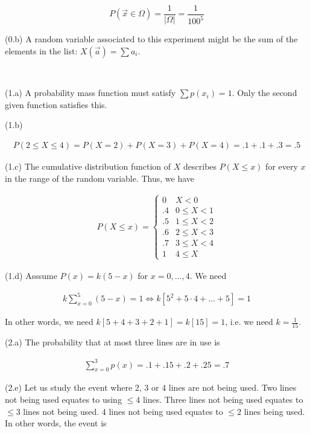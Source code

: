 \documentclass[a4paper, 12pt]{article}
\begin{document}
\begin{equation*}
    P(\overrightarrow{x} \in \Omega) = \frac{1}{|\Omega|} = \frac{1}{100^5}
\end{equation*}

(0.b) A random variable associated to this experiment might be the sum of the elements 
in the list: $X(\overrightarrow{a}) = \sum a_i$.

~ ~ ~ 

(1.a) A probability mass function must satisfy $\sum p(x_i) = 1$. Only the second given 
function satisfies this.

(1.b) 

\begin{align*}
    P(2 \leq X \leq 4) = P(X = 2) + P(X = 3) + P(X=4) = .1 + .1 + .3 = .5
\end{align*}

(1.c) The cumulative distribution function of $X$ describes $P(X \leq x)$  for every $x$
in the range of the random variable. Thus, we have

\begin{align*}
    P(X \leq x) = \begin{cases}
        0 & X < 0 \\ 
        .4 & 0 \leq X < 1 \\ 
        .5 & 1 \leq X < 2 \\ 
        .6 & 2 \leq X < 3 \\ 
        .7 & 3 \leq X < 4\\ 
        1 & 4 \leq X
    \end{cases}
\end{align*}

(1.d) Asssume $P(x) = k(5 - x)$ for $x = 0,\ldots, 4$. We need 

\begin{align*}
    k \sum_{x=0}^{5}(5 - x) = 1 \iff k \left[ 5^2 + 5 \cdot 4 + \ldots + 5 \right] = 1
\end{align*}

In other words, we need $k \left[ 5 + 4 + 3 + 2 +1 \right] = k\left[ 15 \right] = 1$, 
i.e. we need $k = \frac{1}{15}$.


(2.a) The probability that at most three lines are in use is 

\begin{align*}
    \sum_{x = 0}^{3} p(x) = .1 + .15 + .2 + .25 = .7
\end{align*}

(2.e) Let us study the event where 2, 3 or 4 lines are not being used.
Two lines not being used equates to using $\leq 4$ lines. Three lines 
not being used equates to $\leq 3$ lines not being used. 4 lines not 
being used equates to $\leq 2$ lines being used. In other words, 
the event is
\end{document}
